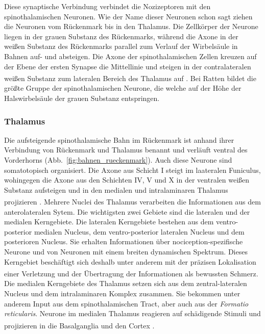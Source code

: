 \documentclass[12pt,a4paper,pdftex]{article}
\begin{document}
\newpage
Diese synaptische Verbindung verbindet die Nozizeptoren mit den spinothalamischen Neuronen. Wie der Name dieser Neuronen schon sagt ziehen die Neuronen vom Rückenmark bis in den Thalamus. Die Zellkörper der Neurone liegen in der grauen Substanz des Rückenmarks, während die Axone in der weißen Substanz des Rückenmarks parallel zum Verlauf der Wirbelsäule in Bahnen auf- und absteigen. Die Axone der spinothalamischen Zellen kreuzen auf der Ebene der ersten Synapse die Mittellinie und steigen in der contralateralen weißen Substanz zum lateralen Bereich des Thalamus auf \textsuperscript{\cite[25]{paxinos2014rat}}. Bei Ratten bildet die größte Gruppe der spinothalamischen Neurone, die welche auf der Höhe der Halswirbelsäule der grauen Substanz entspringen.


\subsubsection*{Thalamus}
Die aufsteigende spinothalamische Bahn im Rückenmark ist anhand ihrer Verbindung von Rückenmark und Thalamus benannt und verläuft ventral des Vorderhorns (Abb.~\ref{fig:bahnen_rueckenmark}). Auch diese Neurone sind somatotopisch organisiert. Die Axone aus Schicht I steigt im laateralen Funiculus, wohingegen die Axone aus den Schichten IV, V und X in der ventralen weißen Substanz aufsteigen und in den medialen und intralaminaren Thalamus projizieren \textsuperscript{\cite[25]{paxinos2014rat}}. 
Mehrere Nuclei des Thalamus verarbeiten die Informationen aus dem anterolateralen Sytem. Die wichtigsten zwei Gebiete sind die lateralen und der medialen Kerngebiete. 
Die lateralen Kerngebiete bestehen aus dem ventro-posterior medialen Nucleus, dem ventro-posterior lateralen Nucleus und dem posterioren Nucleus. Sie erhalten Informationen über nociception-spezifische Neurone und von Neuronen mit einem breiten dynamischen Spektrum. Dieses Kerngebiet beschäftigt sich deshalb unter anderem mit der präzisen Lokalisation einer Verletzung und der Übertragung der Informationen als bewussten Schmerz\textsuperscript{\cite[24]{kandel2013principles}}.
\\
\noindent Die medialen Kerngebiete des Thalamus setzen sich aus dem zentral-lateralen Nucleus und dem intralaminaren Komplex zusammen. Sie bekommen unter anderem Input aus dem spinothalamischen Tract, aber auch aus der \textit{Formatio reticularis}. Neurone im medialen Thalamus reagieren auf schädigende Stimuli und projizieren in die Basalganglia und den Cortex \textsuperscript{\cite[24]{kandel2013principles}}.
\end{document}
